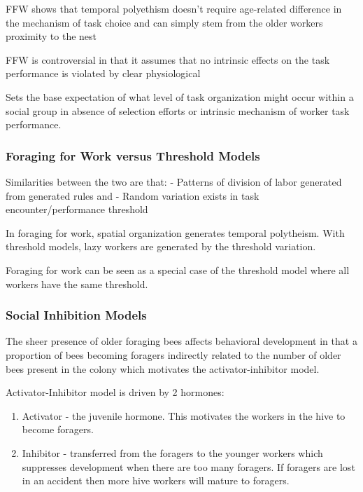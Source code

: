 FFW shows that temporal polyethism doesn't require age-related difference in the mechanism of task choice and can simply stem from the older workers proximity to the nest

FFW is controversial in that it assumes that no intrinsic effects on the task performance is violated by clear physiological 

Sets the base expectation of what level of task organization might occur within a social group in absence of selection efforts or intrinsic mechanism of worker task performance.

\subsubsection{Foraging for Work versus Threshold Models} %
Similarities between the two are that:
- Patterns of division of labor generated from generated rules and 
- Random variation exists in task encounter/performance threshold

In foraging for work, spatial organization generates temporal polytheism. 
With threshold models, lazy workers are generated by the threshold variation. 

Foraging for work can be seen as a special case of the threshold model where all workers have the same threshold. %

\subsubsection{Social Inhibition Models}

The sheer presence of older foraging bees affects behavioral development in that a proportion of bees becoming foragers indirectly related to the number of older bees present in the colony  which motivates the activator-inhibitor model.

Activator-Inhibitor model is driven by 2 hormones:
\begin{enumerate}
	\item Activator - the juvenile hormone. This motivates the workers in the hive to become foragers.
	\item Inhibitor - transferred from the foragers to the younger workers which suppresses development when there are too many foragers. If foragers are lost in an accident then more hive workers will mature to foragers.
\end{enumerate}

